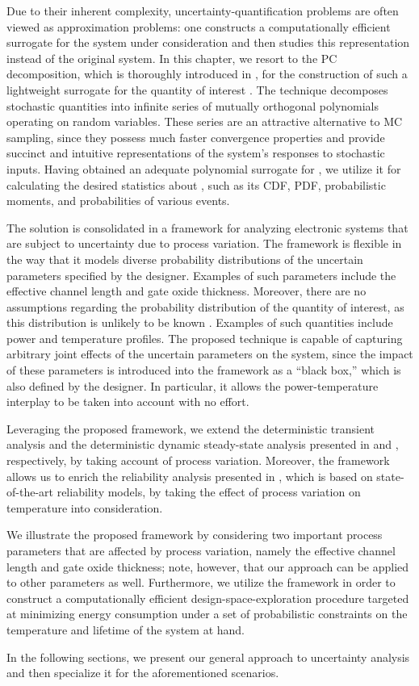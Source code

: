 Due to their inherent complexity, uncertainty-quantification problems are often
viewed as approximation problems: one constructs a computationally efficient
surrogate for the system under consideration and then studies this
representation instead of the original system. In this chapter, we resort to the
\ac{PC} decomposition, which is thoroughly introduced in
, for the construction of such a lightweight surrogate
for the quantity of interest \g. The technique decomposes stochastic quantities
into infinite series of mutually orthogonal polynomials operating on random
variables. These series are an attractive alternative to \ac{MC} sampling, since
they possess much faster convergence properties and provide succinct and
intuitive representations of the system's responses to stochastic inputs. Having
obtained an adequate polynomial surrogate for \g, we utilize it for calculating
the desired statistics about \g, such as its \ac{CDF}, \ac{PDF}, probabilistic
moments, and probabilities of various events.

The solution is consolidated in a framework for analyzing electronic systems
that are subject to uncertainty due to process variation. The framework is
flexible in the way that it models diverse probability distributions of the
uncertain parameters specified by the designer. Examples of such parameters
include the effective channel length and gate oxide thickness. Moreover, there
are no assumptions regarding the probability distribution of the quantity of
interest, as this distribution is unlikely to be known \apriori. Examples of
such quantities include power and temperature profiles. The proposed technique
is capable of capturing arbitrary joint effects of the uncertain parameters on
the system, since the impact of these parameters is introduced into the
framework as a ``black box,'' which is also defined by the designer. In
particular, it allows the power-temperature interplay to be taken into account
with no effort.

Leveraging the proposed framework, we extend the deterministic transient
analysis and the deterministic dynamic steady-state analysis presented in
 and , respectively, by
taking account of process variation. Moreover, the framework allows us to enrich
the reliability analysis presented in , which is based
on state-of-the-art reliability models, by taking the effect of process
variation on temperature into consideration.

We illustrate the proposed framework by considering two important process
parameters that are affected by process variation, namely the effective channel
length and gate oxide thickness; note, however, that our approach can be applied
to other parameters as well. Furthermore, we utilize the framework in order to
construct a computationally efficient design-space-exploration procedure
targeted at minimizing energy consumption under a set of probabilistic
constraints on the temperature and lifetime of the system at hand.

In the following sections, we present our general approach to uncertainty
analysis and then specialize it for the aforementioned scenarios.
